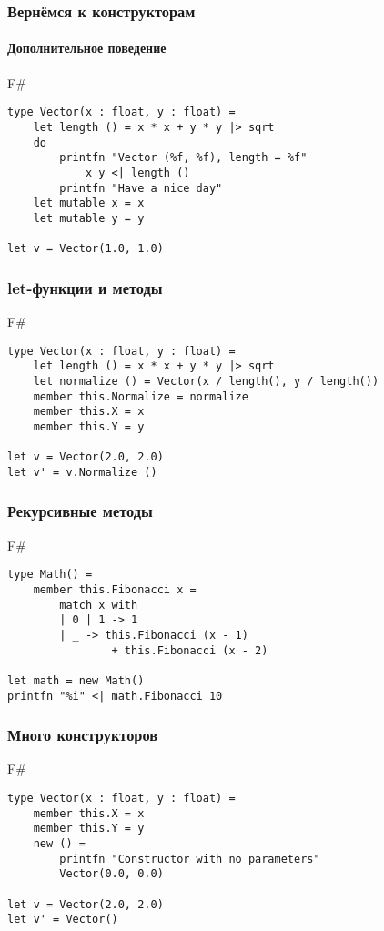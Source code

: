 \documentclass[xetex,mathserif,serif]{beamer}
\begin{document}
   	\begin{frame}[fragile]
   		\frametitle{Вернёмся к конструкторам}
   		\framesubtitle{Дополнительное поведение}
   		\begin{exampleblock}{F\#}
   			\begin{lstlisting}
type Vector(x : float, y : float) = 
    let length () = x * x + y * y |> sqrt
    do 
        printfn "Vector (%f, %f), length = %f" 
            x y <| length ()
        printfn "Have a nice day"
    let mutable x = x
    let mutable y = y

let v = Vector(1.0, 1.0)
\end{lstlisting}
\end{exampleblock}
\end{frame}

   	\begin{frame}[fragile]
   		\frametitle{let-функции и методы}
   		\begin{exampleblock}{F\#}
   			\begin{lstlisting}
type Vector(x : float, y : float) = 
    let length () = x * x + y * y |> sqrt
    let normalize () = Vector(x / length(), y / length())
    member this.Normalize = normalize
    member this.X = x
    member this.Y = y

let v = Vector(2.0, 2.0)
let v' = v.Normalize ()
\end{lstlisting}
\end{exampleblock}
\end{frame}

   	\begin{frame}[fragile]
   		\frametitle{Рекурсивные методы}
   		\begin{exampleblock}{F\#}
   			\begin{lstlisting}
type Math() = 
    member this.Fibonacci x = 
        match x with
        | 0 | 1 -> 1
        | _ -> this.Fibonacci (x - 1) 
                + this.Fibonacci (x - 2)

let math = new Math()
printfn "%i" <| math.Fibonacci 10
\end{lstlisting}
\end{exampleblock}
\end{frame}

   	\begin{frame}[fragile]
   		\frametitle{Много конструкторов}
   		\begin{exampleblock}{F\#}
   			\begin{lstlisting}
type Vector(x : float, y : float) = 
    member this.X = x
    member this.Y = y
    new () = 
        printfn "Constructor with no parameters"
        Vector(0.0, 0.0)

let v = Vector(2.0, 2.0)
let v' = Vector()
\end{lstlisting}
\end{exampleblock}
\end{frame}
\end{document}
